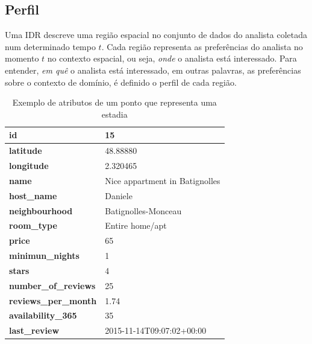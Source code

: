 
\subsection{Perfil}

Uma IDR descreve uma região espacial no conjunto de dados do analista coletada num determinado tempo $t$. Cada região representa as preferências do analista no momento $t$ no contexto espacial, ou seja, {\em onde} o analista está interessado. Para entender, {\em em quê} o analista está interessado, em outras palavras, as preferências sobre o contexto de domínio, é definido o perfil de cada região.

\begin{table}[]
	\centering
	\begin{tabular}{|l|l|}
		\hline
		\textbf{id}                  & 15                             \\ \hline
		\textbf{latitude}            & 48.88880                       \\ \hline
		\textbf{longitude}           & 2.320465                       \\ \hline
		\textbf{name}                & Nice appartment in Batignolles \\ \hline
		\textbf{host\_name}          & Daniele                        \\ \hline
		\textbf{neighbourhood}       & Batignolles-Monceau            \\ \hline
		\textbf{room\_type}          & Entire home/apt                \\ \hline
		\textbf{price}               & 65                             \\ \hline
		\textbf{minimun\_nights}     & 1                              \\ \hline
		\textbf{stars}               & 4                              \\ \hline
		\textbf{number\_of\_reviews} & 25                             \\ \hline
		\textbf{reviews\_per\_month} & 1.74                           \\ \hline
		\textbf{availability\_365}   & 35                             \\ \hline
		\textbf{last\_review}        & 2015-11-14T09:07:02+00:00      \\ \hline
	\end{tabular}
	\caption{Exemplo de atributos de um ponto que representa uma estadia}
	\label{table:atributos}
\end{table}

